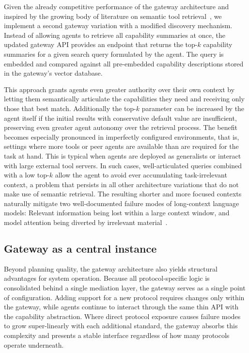 Given the already competitive performance of the gateway architecture and inspired by the growing body of literature on semantic tool retrieval~\cite{gaurav2025dynamicreact, fei2025mcpzero, gan2025ragmcp, lumer2025scalemcp, lumer2025tooltoagent, gaurav2025codemem}, we implement a second gateway variation with a modified discovery mechanism. Instead of allowing agents to retrieve all capability summaries at once, the updated gateway API provides an endpoint that returns the top-$k$ capability summaries for a given search query formulated by the agent. The query is embedded and compared against all pre-embedded capability descriptions stored in the gateway's vector database.

This approach grants agents even greater authority over their own context by letting them semantically articulate the capabilities they need and receiving only those that best match. Additionally the top-$k$ parameter can be increased by the agent itself if the initial results with conservative default value are insufficient, preserving even greater agent autonomy over the retrieval process.
The benefit becomes especially pronounced in imperfectly configured environments, that is, settings where more tools or peer agents are available than are required for the task at hand. This is typical when agents are deployed as generalists or interact with large external tool servers. In such cases, well-articulated queries combined with a low top-$k$ allow the agent to avoid ever accumulating task-irrelevant context, a problem that persists in all other architecture variations that do not make use of semantic retrieval. The resulting shorter and more focused contexts naturally mitigate two well-documented failure modes of long-context language models: Relevant information being lost within a large context window, and model attention being diverted by irrelevant material~\cite{liu2023lostmiddlellms, shi2023llmseasily}.\medskip

\subsection{Gateway as a central instance}
Beyond planning quality, the gateway architecture also yields structural advantages for system operation. 
Because all protocol-specific logic is consolidated behind a single mediation layer, the gateway serves as a single point of configuration. 
Adding support for a new protocol requires changes only within the gateway, while agents continue to interact through the same thin API with the capability abstraction. 
Where direct protocol exposure causes failure modes to grow super-linearly with each additional standard, the gateway absorbs this complexity and presents a stable interface regardless of how many protocols operate underneath. 

